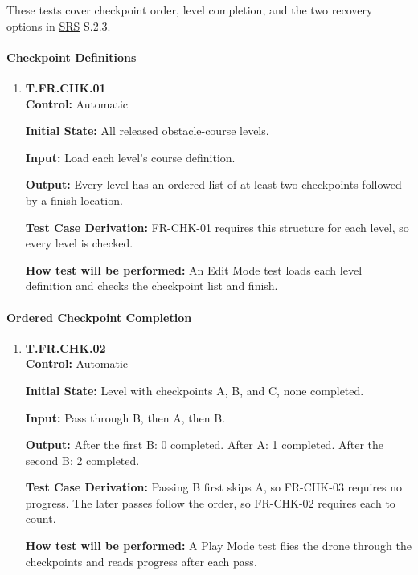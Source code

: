 \documentclass[12pt, titlepage]{article}
\begin{document}
These tests cover checkpoint order, level completion, and the two recovery options in
\hyperlink{abbr:SRS}{SRS} S.2.3.

{\sloppy
\paragraph{Checkpoint Definitions}

\begin{enumerate}

\item{\hypertarget{test-fr-chk-01}{}\textbf{T.FR.CHK.01}\\}
\textbf{Control:} Automatic

\textbf{Initial State:} All released obstacle-course levels.

\textbf{Input:} Load each level's course definition.

\textbf{Output:} Every level has an ordered list of at least two checkpoints followed by
a finish location.

\textbf{Test Case Derivation:} \mbox{FR-CHK-01} requires this structure for each level,
so every level is checked.

\textbf{How test will be performed:} An Edit Mode test loads each level definition and
checks the checkpoint list and finish.

\end{enumerate}

\paragraph{Ordered Checkpoint Completion}

\begin{enumerate}

\item{\hypertarget{test-fr-chk-02}{}\textbf{T.FR.CHK.02}\\}
\textbf{Control:} Automatic

\textbf{Initial State:} Level with checkpoints A, B, and C, none completed.

\textbf{Input:} Pass through B, then A, then B.

\textbf{Output:} After the first B: 0 completed. After A: 1 completed. After the second
B: 2 completed.

\textbf{Test Case Derivation:} Passing B first skips A, so \mbox{FR-CHK-03} requires no
progress. The later passes follow the order, so \mbox{FR-CHK-02} requires each to count.

\textbf{How test will be performed:} A Play Mode test flies the drone through the
checkpoints and reads progress after each pass.


\end{enumerate}}
\end{document}
